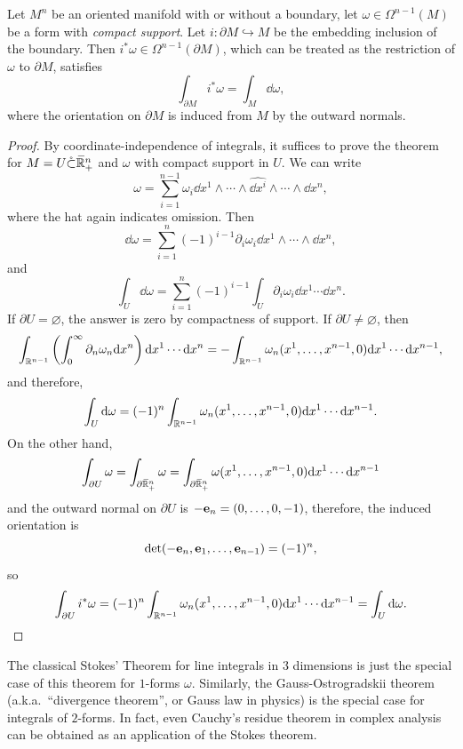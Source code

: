 \begin{thm}
    Let $M^n$ be an oriented manifold with or without a boundary, let $\omega\in \Omega^{n-1}(M)$ be a form with \emph{compact support}. Let $i:\partial M\hookrightarrow M$ be the embedding inclusion of the boundary. Then $i^\ast\omega\in\Omega^{n-1}(\partial M)$, which can be treated as the restriction of $\omega$  to $\partial M$, satisfies
    \[\int_{\partial M}i^\ast \omega=\int_M \dd \omega,\]
    where the orientation on $\partial M$ is induced from $M$ by the outward normals.
\end{thm}
\begin{proof}
    By coordinate-independence of integrals, it suffices to prove the theorem for $M=U\mathring\subset \wb\bbR^n_+$ and $\omega$ with compact support in $U$. We can write
    \[\omega=\sum_{i=1}^{n-1}\omega_i \dd x^1\wedge\cdots \wedge \widehat{\dd x^i}\wedge \cdots\wedge \dd x^n,\]
    where the hat again indicates omission. Then
    \[\dd \omega=\sum_{i=1}^n (-1)^{i-1}\partial_i\omega_i \dd x^1\wedge\cdots\wedge\dd x^n,\]
    and 
    \[\int_U \dd\omega=\sum_{i=1}^n(-1)^{i-1}\int_U \partial_i\omega_i\dd x^1\cdots\dd x^n.\]
    If $\partial U=\varnothing$, the answer is zero by compactness of support. If $\partial U\neq\varnothing$, then
    \[\int_{\bbR^{n-1}}\left(\int_0^\infty \partial_n\omega_n\dd x^n\right)\dd x^1\cdots\dd x^n=-\int_{\bbR^{n-1}}\omega_n(x^1,\ldots,x^{n-1},0)\dd x^1\cdots\dd x^{n-1},\]
    and therefore, 
    \[\int_U \dd\omega=(-1)^n\int_{\bbR^{n-1}}\omega_n(x^1,\ldots,x^{n-1},0)\dd x^1\cdots\dd x^{n-1}.\]
    On the other hand, 
    \[\int_{\partial U}\omega=\int_{\partial \wb\bbR^n_+}\omega=\int_{\partial \wb\bbR^n_+}\omega(x^1,\ldots,x^{n-1},0)\dd x^1\cdots \dd x^{n-1}\] 
    and the outward normal on $\partial U$ is $-\bf{e}_n=(0,\ldots,0,-1)$, therefore, the induced orientation is 
    \[\det(-\bf{e}_n,\bf{e}_1,\ldots,\bf{e}_{n-1})=(-1)^n,\] 
    so
    \[\int_{\partial U}i^\ast\omega=(-1)^{n}\int_{\bbR^{n-1}}\omega_n(x^1,\ldots,x^{n-1},0)\dd x^1\cdots\dd x^{n-1}=\int_U \dd\omega.\]
\end{proof}
\begin{rem}
    The classical Stokes' Theorem for line integrals in $3$ dimensions is just the special case of this theorem for $1$-forms $\omega$. Similarly, the Gauss-Ostrogradskii theorem (a.k.a.\ ``divergence theorem'', or Gauss law in physics) is the special case for integrals of $2$-forms. In fact, even Cauchy's residue theorem in complex analysis can be obtained as an application of the Stokes theorem.
\end{rem}

